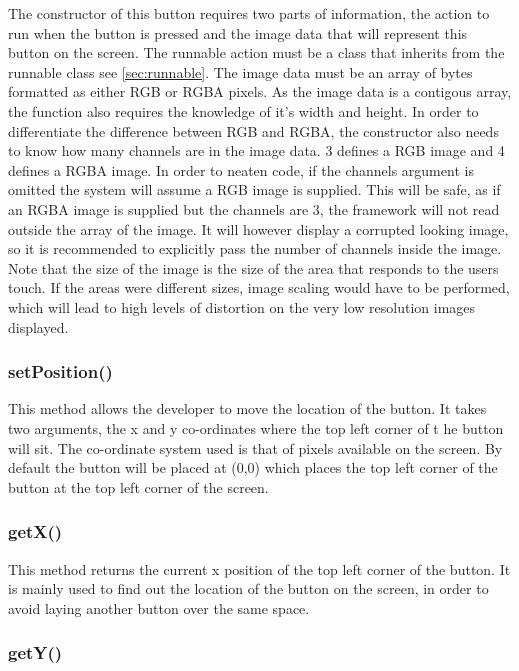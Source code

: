 The constructor of this button requires two parts of information, the action to run when the button is pressed and the image data that will represent this button on the screen. The runnable action must be a class that inherits from the runnable class see \ref{sec:runnable}. The image data must be an array of bytes formatted as either RGB or RGBA pixels. As the image data is a contigous array, the function also requires the knowledge of it's width and height. In order to differentiate the difference between RGB and RGBA, the constructor also needs to know how many channels are in  the image data. 3 defines a RGB image and 4 defines a RGBA image. In order to neaten code, if the channels argument is omitted the system will assume a RGB image is supplied. This will be safe, as if an RGBA image is supplied but the channels are 3, the framework will not read outside the array of the image. It will however display a corrupted looking image, so it is recommended to explicitly pass the number of channels inside the image. 
Note that the size of the image is the size of the area that responds to the users touch. If the areas were different sizes, image scaling would have to be performed, which will lead to high levels of distortion on the very low resolution images displayed.

\subsubsection{setPosition()}

This method allows the developer to move the location of the button. It takes two arguments, the x and y co-ordinates where the top left corner of t he button will sit. The co-ordinate system used is that of pixels available on the screen. By default the button will be placed at (0,0) which places the top left corner of the button at the top left corner of the screen.

\subsubsection{getX()}

This method returns the current x position of the top left corner of the button. It is mainly used to find out the location of the button on the screen, in order to avoid laying another button over the same space.

\subsubsection{getY()}


